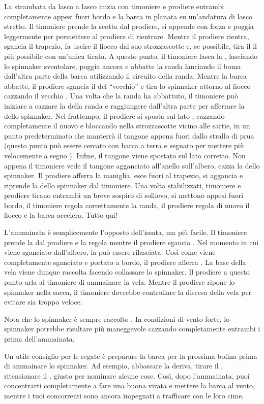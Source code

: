 La strambata da lasco a lasco inizia con timoniere e prodiere entrambi
completamente appesi fuori bordo e la barca in planata su un'andatura di lasco
stretto. Il timoniere prende la scotta dal prodiere, si appende con forza e
poggia leggermente per permettere al prodiere di rientrare. Mentre il prodiere
rientra, sgancia il trapezio, fa uscire il fiocco dal suo strozzascotte e, se
possibile, tira il \twingline \leeward il più possibile con un'unica tirata. A
questo punto, il timoniere lasca la \sheet, lasciando lo spinnaker sventolare,
poggia ancora e abbatte la randa lanciando il boma dall'altra parte della barca
utilizzando il circuito della randa. Mentre la barca abbatte, il
prodiere sgancia il \twingline del ``vecchio'' \windward e tira lo
spinnaker attorno al fiocco cazzando il vecchio \guy. Una volta che la randa
ha abbattuto, il timoniere può iniziare a cazzare la \sheet della randa e
raggiungere dall'altra parte per afferrare la \sheet dello spinnaker.
%
Nel frattempo, il prodiere si sposta sul lato \windward, cazzando completamente
il nuovo \twingline \windward e bloccando \theguy nella strozzascotte vicino
alle sartie, in un punto predeterminato che manterrà il tangone appena fuori
dallo strallo di prua (questo punto può essere cercato con barca a terra e
segnato per mettere più velocemente a segno \thepole). Infine, il tangone viene
spostato sul lato corretto. Non appena il timoniere vede il tangone agganciato
all'anello sull'albero, cazza la \sheet dello spinnaker. Il prodiere afferra la
maniglia, esce fuori al trapezio, si aggancia e riprende la \sheet dello
spinnaker dal timoniere. Una volta stabilizzati, timoniere e prodiere tirano
entrambi un breve sospiro di sollievo, si mettono appesi fuori bordo, il
timoniere regola correttamente la randa, il prodiere regola di nuovo il fiocco e
la barca accelera. Tutto qui!

L'ammainata è semplicemente l'opposto dell'issata, ma più facile. Il timoniere
prende la \sheet dal prodiere e la regola mentre il prodiere sgancia \theguy.
Nel momento in cui \thepole viene sganciato dall'albero, la \sheet può essere
rilasciata. Così come \thepole viene completamente sganciato e portato a bordo,
il prodiere afferra \theguy. La base della vela viene dunque raccolta facendo
collassare lo spinnaker. Il prodiere a questo punto urla al timoniere di
ammainare la vela. Mentre il prodiere ripone lo spinnaker nella sacca, il
timoniere dovrebbe controllare la discesa della vela per evitare sia troppo
veloce.

Nota che lo spinnaker è sempre raccolto \windward. In condizioni di vento forte,
lo spinnaker potrebbe risultare più maneggevole cazzando completamente entrambi
i \twinglines prima dell'ammainata.

Un utile consiglio per le regate è preparare la barca per la prossima bolina
prima di ammainare lo spinnaker. Ad esempio, abbassare la deriva, tirare il
\cunningham, ritensionare il \outhaul, giusto per nominare alcune cose. Così,
dopo l'ammainata, puoi concentrarti completamente a fare una buona
virata e mettere la barca al vento, mentre i tuoi concorrenti sono ancora
impegnati a trafficare con le loro cime.